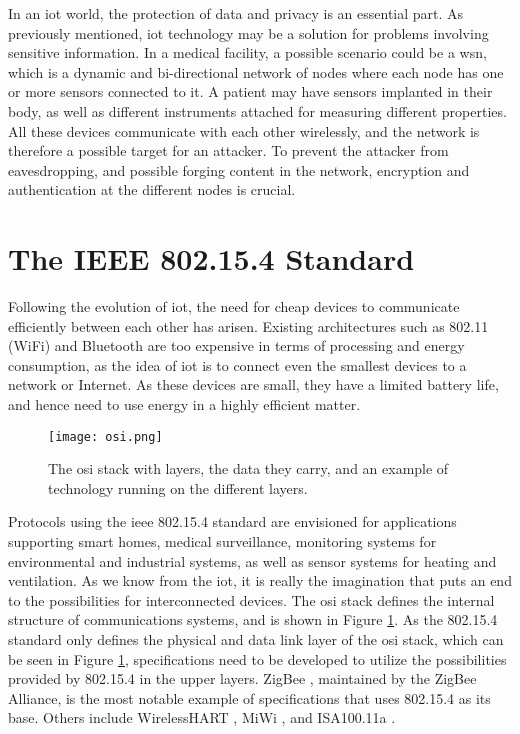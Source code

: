 In an \gls{iot} world, the protection of data and privacy is an essential part. As previously mentioned, \gls{iot} technology may be a solution for problems involving sensitive information. In a medical facility, a possible scenario could be a \gls{wsn}, which is a dynamic and bi-directional network of nodes where each node has one or more sensors connected to it. A patient may have sensors implanted in their body, as well as different instruments attached for measuring different properties. All these devices communicate with each other wirelessly, and the network is therefore a possible target for an attacker. To prevent the attacker from eavesdropping, and possible forging content in the network, encryption and authentication at the different nodes is crucial.








\section{The IEEE 802.15.4 Standard}
\label{sec:802154}

Following the evolution of \gls{iot}, the need for cheap devices to communicate efficiently between each other has arisen. Existing architectures such as 802.11 (WiFi) and Bluetooth are too expensive in terms of processing and energy consumption, as the idea of \gls{iot} is to connect even the smallest devices to a network or Internet. As these devices are small, they have a limited battery life, and hence need to use energy in a highly efficient matter.

\begin{figure}[h]
	\centering
	\texttt{[image: osi.png]}
	\caption{The \gls{osi} stack with layers, the data they carry, and an example of technology running on the different layers.}
	\label{fig:osi}
\end{figure}

Protocols using the \gls{ieee} 802.15.4 standard are envisioned for applications supporting smart homes, medical surveillance, monitoring systems for environmental and industrial systems, as well as sensor systems for heating and ventilation. As we know from the \gls{iot}, it is really the imagination that puts an end to the possibilities for interconnected devices. The \gls{osi} stack defines the internal structure of communications systems, and is shown in Figure \ref{fig:osi}. As the 802.15.4 standard only defines the physical and data link layer of the \gls{osi} stack, which can be seen in Figure \ref{fig:osi}, specifications need to be developed to utilize the possibilities provided by 802.15.4 in the upper layers. ZigBee \cite{zigbee}, maintained by the ZigBee Alliance, is the most notable example of specifications that uses 802.15.4 as its base. Others include WirelessHART \citep{wirelesshart}, MiWi \cite{miwi}, and ISA100.11a \cite{isa100}.

